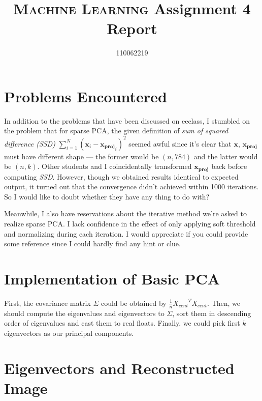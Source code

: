 \documentclass[a4paper]{article}
\title{\vspace{-2.5em}\textsc{Machine Learning} Assignment 4 Report}
\author{\vspace{-.5em}110062219}
\date{}
\begin{document}
\maketitle

\section{Problems Encountered}

In addition to the problems that have been discussed on eeclass, I stumbled on the problem that for sparse PCA, the given definition of \textit{sum of squared difference (SSD)} $\sum_{i=1}^N(\mathbf{x}_i-\mathbf{x_{proj}}_i)^2$ seemed awful since it's clear that $\mathbf{x}$, $\mathbf{x_{proj}}$ must have different shape --- the former would be $(n, 784)$ and the latter would be $(n, k)$. Other students and I coincidentally transformed $\mathbf{x_{proj}}$ back before computing \textit{SSD}. However, though we obtained results identical to expected output, it turned out that the convergence didn't achieved within 1000 iterations. So I would like to doubt whether they have any thing to do with?

Meanwhile, I also have reservations about the iterative method we're asked to realize sparse PCA. I lack confidence in the effect of only applying soft threshold and normalizing during each iteration. I would appreciate if you could provide some reference since I could hardly find any hint or clue.

\section{Implementation of Basic PCA}

First, the covariance matrix $\Sigma$ could be obtained by $\frac{1}{n}{X_{cent}}^TX_{cent}$. Then, we should compute the eigenvalues and eigenvectors to $\Sigma$, sort them in descending order of eigenvalues and cast them to real floats. Finally, we could pick first $k$ eigenvectors as our principal components.

\section{Eigenvectors and Reconstructed Image}
\end{document}

